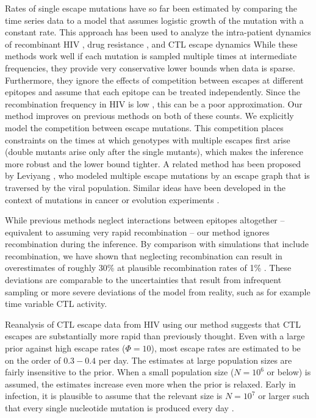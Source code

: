 \documentclass{frontiers}
\newcommand{\fitprior}{\Phi}
\begin{document}
Rates of single escape mutations have so far been estimated by comparing the
time series data to a model that assumes logistic growth of the mutation with a
constant rate. This approach has been used to analyze the intra-patient dynamics
of recombinant HIV \citep{Liu:2002p20788}, drug resistance
\citep{Paredes:2009p40058,Bonhoeffer:2002p40059}, and CTL escape dynamics
\citep{Asquith:2006p28003,ganusov_fitness_2011,ganusov_estimating_2006,asquith_vivo_2007,petravic_estimating_2008}
While these methods work well if
each mutation is sampled multiple times at intermediate frequencies, they
provide very conservative lower bounds when data is sparse.
Furthermore, they ignore the effects of competition between escapes at different
epitopes and assume that each epitope can be treated independently.
Since the recombination frequency in HIV is low
\citep{Neher:2010p32691,Batorsky:2011p40107,Josefsson:2011p42531}, this can be a
poor approximation. Our method improves on previous methods on both of these
counts. We explicitly model the competition between escape mutations. This
competition places constraints on the times at which genotypes with multiple
escapes first arise (double mutants arise only after the single mutants), which
makes the inference more robust and the lower bound tighter. A related method
has been proposed by Leviyang \citep{leviyang_computational_2013}, who modeled multiple
escape mutations by an escape graph that is traversed by the viral population.
Similar ideas have been developed in the context of mutations in cancer or
evolution experiments \citep{illingworth_method_2012}. 

While previous methods neglect interactions between epitopes
altogether -- equivalent to assuming very rapid recombination -- our
method ignores recombination during the inference. By comparison with
simulations that include recombination,
we have shown that neglecting recombination can result in
overestimates of roughly 30\% at plausible recombination rates of
1\% \citep{Neher:2010p32691,Batorsky:2011p40107}. These deviations are
comparable to the uncertainties that result from infrequent sampling
or more severe deviations of the model from reality, such as for
example time variable CTL activity.

Reanalysis of CTL escape data from HIV using our method suggests that
CTL escapes are substantially more rapid than previously thought. Even
with a large prior against high escape rates ($\fitprior=10$), most
escape rates are estimated to be on the order of $0.3-0.4$ per day. The
estimates at large population sizes are fairly insensitive to the prior.
When a small population size ($N=10^6$ or below) is assumed, the
estimates increase even more when the prior is relaxed. Early in
infection, it is plausible to assume that the relevant size is $N=10^7$
or larger such that every single nucleotide mutation is produced every
day
\citep{boltz_ultrasensitive_2012,coffin_hiv_1995,perelson_dynamics_1997}.
\end{document}
